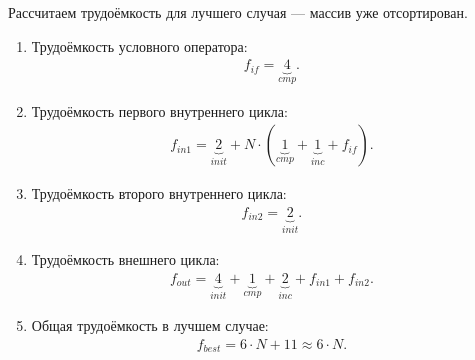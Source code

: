 Рассчитаем трудоёмкость для лучшего случая --- массив уже отсортирован.
\begin{enumerate}
	\item Трудоёмкость условного оператора:
	\begin{equation}
		\begin{gathered}
			f_{if} = \underbrace{4}_{cmp}.
		\end{gathered}
	\end{equation}
	\item Трудоёмкость первого внутреннего цикла:
	\begin{equation}
		\begin{gathered}
			f_{in1} = \underbrace{2}_{init} + N \cdot (\underbrace{1}_{cmp} + 	\underbrace{1}_{inc} + f_{if}).
		\end{gathered}
	\end{equation}
	\item Трудоёмкость второго внутреннего цикла:
	\begin{equation}
		\begin{gathered}
			f_{in2} = \underbrace{2}_{init}.
		\end{gathered}
	\end{equation}
	\item Трудоёмкость внешнего цикла:
	\begin{equation}
		\begin{gathered}
			f_{out} = \underbrace{4}_{init} + \underbrace{1}_{cmp} + \underbrace{2}_{inc} + f_{in1} + f_{in2}.
		\end{gathered}
	\end{equation}
	\item Общая трудоёмкость в лучшем случае:
	\begin{equation}
		\begin{gathered}
			f_{best} =6 \cdot N + 11 \approx 6 \cdot N.
		\end{gathered}
	\end{equation}
\end{enumerate}	

\clearpage
